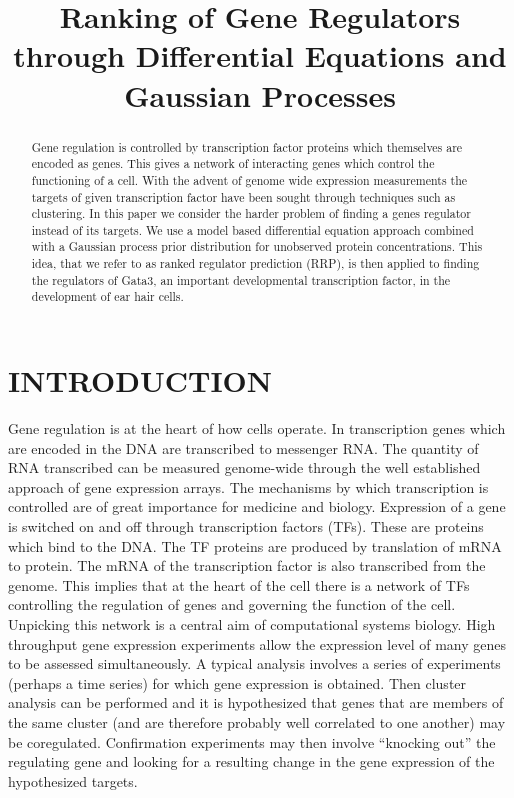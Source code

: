 \documentclass{article}
\title{Ranking of Gene Regulators through Differential Equations and Gaussian Processes}
\begin{document}
\maketitle

\begin{abstract}
  Gene regulation is controlled by transcription factor proteins which
  themselves are encoded as genes. This gives a network of interacting
  genes which  control the functioning of  a cell. With  the advent of
  genome   wide   expression  measurements   the   targets  of   given
  transcription  factor have  been sought  through techniques  such as
  clustering. In this paper we  consider the harder problem of finding
  a  genes regulator instead  of its  targets.  We  use a  model based
  differential  equation  approach combined  with  a Gaussian  process
  prior distribution for unobserved protein concentrations. This idea,
  that  we refer  to as  ranked  regulator prediction  (RRP), is  then
  applied   to  finding   the  regulators   of  Gata3,   an  important
  developmental transcription  factor, in the development  of ear hair
  cells.
\end{abstract}

\section{INTRODUCTION}

Gene regulation is at the heart of how cells operate. In transcription
genes  which are  encoded in  the  DNA are  transcribed to  messenger
RNA.  The  quantity of  RNA  transcribed  can  be measured  genome-wide
through the  well established approach of gene  expression arrays. The
mechanisms  by   which  transcription  is  controlled   are  of  great
importance for medicine and biology.  Expression of a gene is switched
on  and off through  transcription factors  (TFs). These  are proteins
which bind to the DNA. The  TF proteins are produced by translation of
mRNA  to  protein.  The  mRNA  of the  transcription  factor  is  also
transcribed from  the genome.  This implies that  at the heart  of the
cell there is a network of TFs controlling the regulation of genes and
governing  the function  of  the  cell. Unpicking  this  network is  a
central  aim of  computational systems  biology. High  throughput gene
expression experiments allow the expression  level of many genes to be
assessed  simultaneously.  A typical  analysis  involves  a series  of
experiments  (perhaps a  time  series) for  which  gene expression  is
obtained.  Then   cluster  analysis  can   be  performed  and   it  is
hypothesized that genes that are  members of the same cluster (and are
therefore   probably  well   correlated   to  one   another)  may   be
coregulated.  Confirmation  experiments  may then  involve  ``knocking
out'' the  regulating gene and looking  for a resulting  change in the
gene expression of the hypothesized targets.
\end{document}
